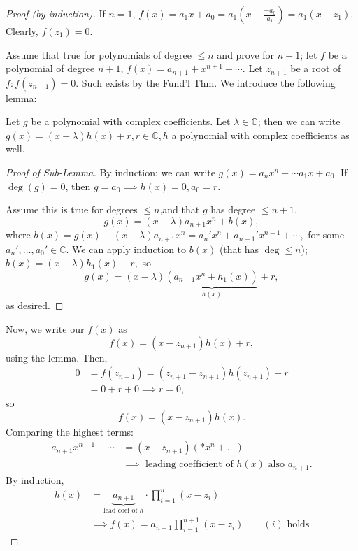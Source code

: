 \documentclass[12pt,oneside]{article}
\begin{document}
\begin{proof}[Proof (by induction)]
  If $n=1$, $f(x) = a_1 x + a_0 = a_1 \left(x - \frac{-a_0}{a_1}\right) = a_1 (x-z_1).$ Clearly, $f(z_1) = 0$.
  

  Assume that true for polynomials of degree $\leq n$ and prove for $n+1$; let $f$ be a polynomial of degree $n+1$, $f(x) = a_{n+1} + x^{n+1} + \cdots$. Let $z_{n+1}$ be a root of $f: f(z_{n+1}) = 0$. Such exists by the Fund'l Thm. We introduce the following lemma:
  \begin{lemma}
    Let $g$ be a polynomial with complex coefficients. Let $\lambda \in \mathbb{C}$; then we can write $g(x) = (x-\lambda)h(x) + r, r \in \mathbb{C}, h$ a polynomial with complex coefficients as well.
  \end{lemma}
  \begin{proof}[Proof of Sub-Lemma]
    By induction; we can write $g(x) = a_n x^n + \cdots a_1 x + a_0$. If $\deg(g) = 0$, then $g = a_0 \implies h(x) = 0, a_0 = r$.

    Assume this is true for degrees $\leq n$,and that $g$ has degree $\leq n + 1$. $$g(x) = (x - \lambda)a_{n+1}x^n + b(x),$$ where $b(x) = g(x) - (x-\lambda)a_{n+1}x^n = a_n' x^n + a_{n-1}' x^{n-1} + \cdots,$ for some $a_n', \dots, a_0' \in \mathbb{C}$. We can apply induction to $b(x)$ (that has $\deg \leq n$); $b(x) = (x-\lambda)h_1(x)+r,$ so $$g(x) = (x-\lambda)\underbrace{(a_{n+1}x^n+h_1(x))}_{h(x)}+r,$$ as desired.
  \end{proof}


  Now, we write our $f(x)$ as \[f(x) = (x-z_{n+1})h(x) + r, \] using the lemma. Then, \begin{align*}
    0 &= f(z_{n+1}) = (z_{n+1}-z_{n+1})h(z_{n+1}) + r\\
    &= 0 + r + 0 \implies r = 0,
  \end{align*}
  so \[f(x) = (x-z_{n+1})h(x).\] Comparing the highest terms: \begin{align*}
    a_{n+1}x^{n+1} + \cdots &= (x-z_{n+1})(*x^n + \dots)\\
    &\implies \text{ leading coefficient of } h(x) \text{ also } a_{n+1}.
  \end{align*}
  By induction, 
  \begin{align*}
    h(x) &= \underbrace{a_{n+1}}_{\text{lead coef of } h} \cdot \prod_{i=1}^{n}(x-z_i)\\
    &\implies f(x) = a_{n+1} \prod_{i=1}^{n+1} (x-z_i) \qquad (i)\text{ holds}
  \end{align*}


\end{proof}
\end{document}
